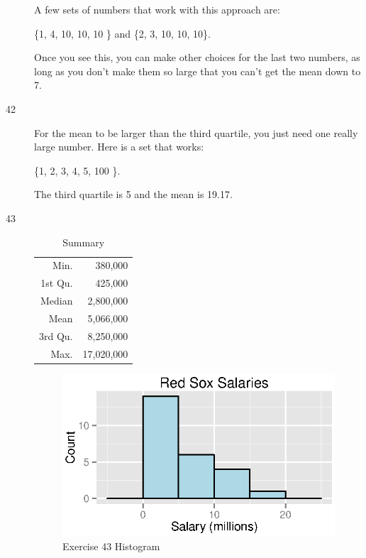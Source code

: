 \documentclass{exam}
\begin{document}
\begin{description}
        A few sets of numbers that work with this approach are: 
        
        \{1, 4, 10, 10, 10 \} and \{2, 3, 10, 10, 10\}.

        Once you see this, you can make other choices for the last two numbers, as long as you don't make them so large
        that you can't get the mean down to 7.  

      \item[42]
        For the mean to be larger than the third quartile, you just need one really large number.  Here is a set that
        works: 
        
        \{1, 2, 3, 4, 5, 100 \}.  
        
        The third quartile is 5 and the mean is 19.17.

      \item[43]
        \begin{table}[ht]
          \centering
          \begin{tabular}{rr}
            \toprule
            Min.    & 380,000 \\
            1st Qu. & 425,000 \\
            Median  & 2,800,000 \\
            Mean    & 5,066,000 \\
            3rd Qu. & 8,250,000 \\
            Max.    & 17,020,000 \\
            \bottomrule
          \end{tabular}
          \caption{Summary}
        \end{table}

        \begin{figure}[H]
          \centering
          \includegraphics{figures/ex43.eps}
          \caption{Exercise 43 Histogram}
        \end{figure}


\end{description}
\end{document}
